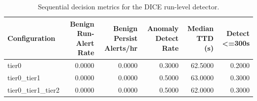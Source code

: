 \begin{table}[t]
\centering
\caption{Sequential decision metrics for the DICE run-level detector.}
\label{tab:dice_sequential_metrics}
\footnotesize
\begin{tabular}{lrrrrr}
\toprule
Configuration & Benign Run-Alert Rate & Benign Persist Alerts/hr & Anomaly Detect Rate & Median TTD (s) & Detect <=300s \\
\midrule
tier0 & 0.0000 & 0.0000 & 0.3000 & 62.5000 & 0.2000 \\
tier0_tier1 & 0.0000 & 0.0000 & 0.5000 & 63.0000 & 0.3000 \\
tier0_tier1_tier2 & 0.0000 & 0.0000 & 0.5000 & 62.0000 & 0.3000 \\
\bottomrule
\end{tabular}

\end{table}
